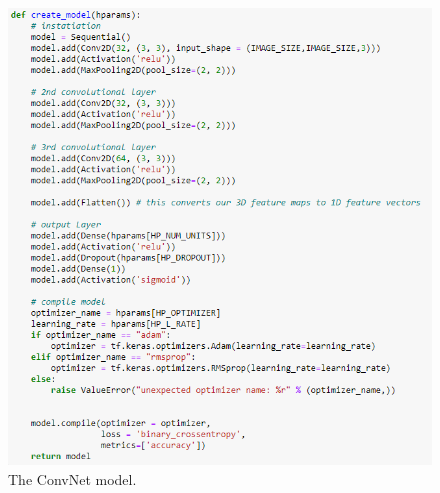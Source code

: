 \begin{figure}[H]
    \centering
    \includegraphics[width=\textwidth]{figures/convnet-model.png}
    \caption{The ConvNet model.}
    \label{fig:convnet-model}
\end{figure}